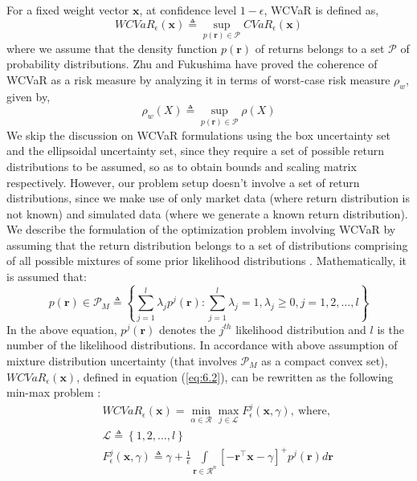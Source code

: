 \documentclass[12pt]{article}
\numberwithin{equation}{section}
\begin{document}
For a fixed weight vector $\mathbf{x}$, at confidence level $1-\epsilon$, WCVaR is defined as,
\begin{equation}
WCVaR_{\epsilon}(\mathbf{x}) \triangleq \sup_{p(\mathbf{r}) \in \mathcal{P}}CVaR_{\epsilon}(\mathbf{x})
\label{eq:6.2}
\end{equation}
where we assume that the density function $p(\mathbf{r})$ of returns belongs to a set $\mathcal{P}$ of probability distributions. Zhu and Fukushima \cite{zhu} have proved the coherence of WCVaR as a risk measure by analyzing it in terms of worst-case risk measure $\rho_{w}$, given by,
\begin{equation}
\rho_{w}(X) \triangleq \sup_{p(\mathbf{r}) \in \mathcal{P}} \rho (X)
\label{eq:6.3}
\end{equation}
We skip the discussion on WCVaR formulations using the box uncertainty set and the ellipsoidal uncertainty set, since they require a set of possible return distributions to be assumed, so as to obtain bounds and scaling matrix respectively. However, our problem setup doesn't involve a set of return distributions, since we make use of only market data (where return distribution is not known) and simulated data (where we generate a known return distribution).
We describe the formulation of the optimization problem involving WCVaR by assuming that the return distribution belongs to a set of distributions
comprising of all possible mixtures of some prior likelihood distributions \cite{zhu}. Mathematically, it is assumed that:
\begin{equation}
p(\mathbf{r}) \in \mathcal{P}_{M} \triangleq \left\{\sum\limits_{j=1}^{l} \lambda_{j}p^{j}(\mathbf{r}):\sum\limits_{j=1}^{l}\lambda_{j}=1,
\lambda_{j} \geq 0,j=1,2,\dots,l \right\}
\label{eq:6.8}
\end{equation}
In the above equation, $p^{j}(\mathbf{r})$ denotes the $j^{th}$ likelihood distribution and $l$ is the number of the likelihood distributions.
In accordance with above assumption of mixture distribution uncertainty (that involves $\mathcal{P}_{M}$ as a compact convex set),
$WCVaR_{\epsilon}(\mathbf{x})$, defined in equation (\ref{eq:6.2}), can be rewritten as the following min-max problem \cite{zhu}:
\begin{eqnarray}
&& WCVaR_{\epsilon}(\mathbf{x})=\min_{\alpha \in \mathcal{R}} \max_{j \in \mathcal{L}} F_{\epsilon}^{j}(\mathbf{x},\gamma),~\text{where},\\ \nonumber
&& \mathcal{L} \triangleq \left\{1,2,\dots,l\right\} \\
&& F_{\epsilon}^{j}(\mathbf{x},\gamma) \triangleq \gamma+\frac{1}{\epsilon}\int \limits_{\mathbf{r} \in \mathcal{R}^{n}}
\left[-\mathbf{r}^{\top}\mathbf{x}-\gamma\right]^{+} p^{j}(\mathbf{r}) d\mathbf{r} \nonumber
\label{eq:6.9}
\end{eqnarray}
\end{document}
